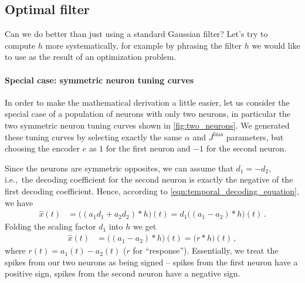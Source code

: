 \documentclass[10pt,letterpaper,oneside]{article}
\begin{document}
\subsection{Optimal filter}

Can we do better than just using a standard Gaussian filter? Let's try to compute $h$ more systematically, for example by phrasing the filter $h$ we would like to use as the result of an optimization problem.

\paragraph{Special case: symmetric neuron tuning curves}
In order to make the mathematical derivation a little easier, let us consider the special case of a population of neurons with only two neurons, in particular the two symmetric neuron tuning curves shown in \cref{fig:two_neurons}. We generated these tuning curves by selecting exactly the same $\alpha$ and $J^\mathrm{bias}$ parameters, but choosing the encoder $e$ as $1$ for the first neuron and $-1$ for the second neuron.

Since the neurons are symmetric opposites, we can assume that $d_1 = -d_2$, i.e.,~the decoding coefficient for the second neuron is exactly the negative of the first decoding coefficient. Hence, according to \cref{eqn:temporal_decoding_equation}, we have
\begin{align*}
	\hat x(t)
		&= \big((a_1 d_1 + a_2 d_2) \ast h \big)(t) =  d_1 \big((a_1 - a_2) \ast h \big)(t) \,.
\end{align*}
Folding the scaling factor $d_1$ into $h$ we get
\begin{align*}
	\hat x(t) &= \big((a_1 - a_2) \ast h \big)(t) = \big(r \ast h \big)(t) \,,
\end{align*}
where $r(t) = a_1(t) - a_2(t)$ ($r$ for \enquote{response}). Essentially, we treat the spikes from our two neurons as being signed -- spikes from the first neuron have a positive sign, spikes from the second neuron have a negative sign.

\end{document}
